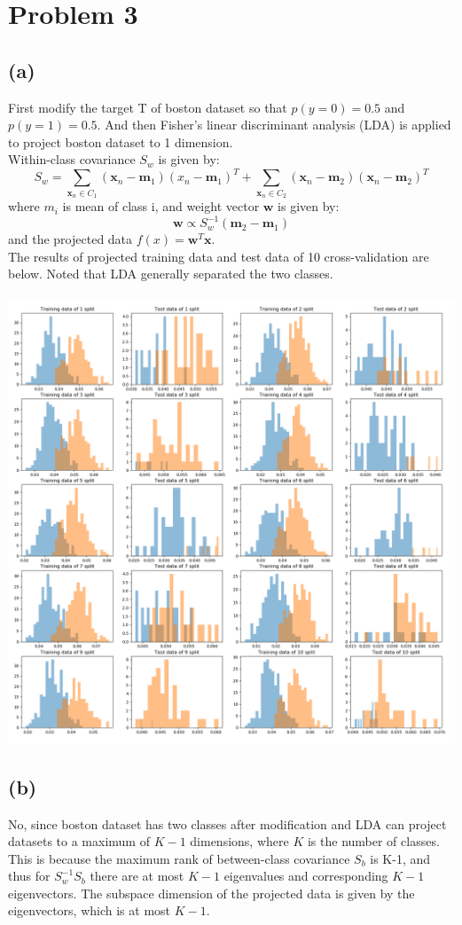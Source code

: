 \documentclass[a4paper]{article}
\begin{document}
\section{Problem 3}
\subsection{(a)}
First modify the target T of boston dataset so that $p(y=0) = 0.5$ and $p(y=1) = 0.5$. And then Fisher's linear discriminant analysis (LDA) is applied to project boston dataset to 1 dimension. \\
Within-class covariance $S_{w}$ is given by:
$$S_{w} = \sum_{\mathbf{x}_{n}\in C_{1}} (\mathbf{x}_{n}-\mathbf{m}_{1})(x_{n}-\mathbf{m}_{1})^{T} + \sum_{\mathbf{x}_{n}\in C_{2}} (\mathbf{x}_{n}-\mathbf{m}_{2})(\mathbf{x}_{n}-\mathbf{m}_{2})^{T}$$
where $m_{i}$ is mean of class i, and weight vector $\mathbf{w}$ is given by:
$$\mathbf{w} \propto S_{w}^{-1}(\mathbf{m}_{2}-\mathbf{m}_{1})$$
and the projected data $f(x) = \mathbf{w}^{T}\mathbf{x}$. \\
The results of projected training data and test data of 10 cross-validation are below. Noted that LDA generally separated the two classes.\\
\\
\includegraphics[width=\textwidth]{q3a.png}
\subsection{(b)}
No, since boston dataset has two classes after modification and LDA can project datasets to a maximum of $K-1$ dimensions, where $K$ is the number of classes.\\
This is because the maximum rank of between-class covariance $S_{b}$ is K-1, and thus for $S_{w}^{-1}S_{b}$ there are at most $K-1$ eigenvalues and corresponding $K-1$ eigenvectors. The subspace dimension of the projected data is given by the eigenvectors, which is at most $K-1$.
\end{document}
